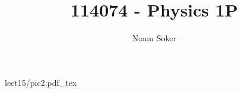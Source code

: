 \documentclass []{article}
\title {114074 - Physics 1P}
\author {Noam Soker}
\begin{document}
\pagestyle {empty}\begin {center}\def \svgwidth {0.99\textwidth } {lect15/}{pic2.pdf_tex}\end {center}
\end{document}
